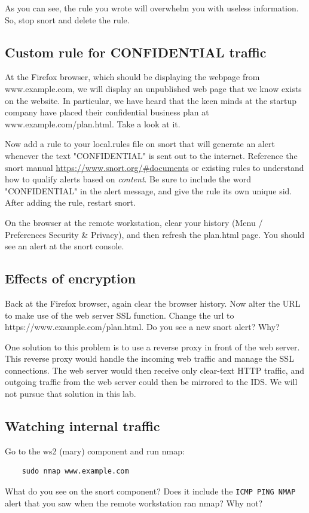 As you can see, the rule you wrote will overwhelm you with useless information.  So,
stop snort and delete the rule.

\subsection{Custom rule for CONFIDENTIAL traffic}
At the Firefox browser, which should be displaying the webpage from www.example.com,
we will display an unpublished web page that we know exists on the website.  In particular,
we have heard that the keen minds at the startup company have placed their confidential 
business plan at www.example.com/plan.html.  Take a look at it.

Now add a rule to your local.rules file on snort that will generate an alert 
whenever the text "CONFIDENTIAL" is sent out to the internet.  Reference 
the snort manual \url{https://www.snort.org/#documents}
or existing rules to understand how to qualify alerts based on \textit{content}.  Be sure to include the
word "CONFIDENTIAL" in the alert message, and give the
rule its own unique sid.  After adding the rule, restart snort.

On the browser at the remote workstation, clear your history (Menu / Preferences 
Security \& Privacy), and then refresh the plan.html page.  You should see an alert at
the snort console.

\subsection{Effects of encryption}
Back at the Firefox browser, again clear the browser history. Now alter the URL to make
use of the web server SSL function.  Change the url to https://www.example.com/plan.html.
Do you see a new snort alert?  Why?

One solution to this problem is to use a reverse proxy in front of the web server.  This
reverse proxy would handle the incoming web traffic and manage the SSL connections.
The web server would then receive only clear-text HTTP traffic, and outgoing traffic from the web server
could then be mirrored to the IDS.  We will not pursue that solution in this lab.

\subsection{Watching internal traffic}
Go to the ws2 (mary) component and run nmap:
\begin{verbatim}
    sudo nmap www.example.com
\end{verbatim}
What do you see on the snort component?  Does it include the {\tt ICMP PING NMAP}
alert that you saw when the remote workstation ran nmap?  Why not?

